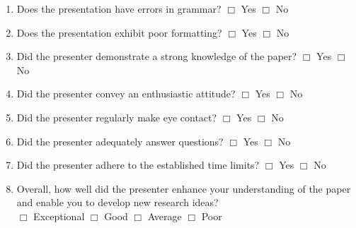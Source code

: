 \documentclass[letterpaper, 10pt]{article} %
\begin{document}
{\begin{enumerate}
\item Does the presentation have errors in grammar? \hspace*{.05in}
  $\Box$ Yes \hspace*{.05in} $\Box$ No

\item Does the presentation exhibit poor formatting? \hspace*{.05in}
  $\Box$ Yes \hspace*{.05in} $\Box$ No

\item Did the presenter demonstrate a strong knowledge of the
  paper? \hspace*{.05in} $\Box$ Yes \hspace*{.05in} $\Box$ No

\item Did the presenter convey an enthusiastic attitude? \hspace*{.05in}
  $\Box$ Yes \hspace*{.05in} $\Box$ No

\item Did the presenter regularly make eye contact? \hspace*{.05in}
  $\Box$ Yes \hspace*{.05in} $\Box$ No

\item Did the presenter adequately answer questions? \hspace*{.05in}
  $\Box$ Yes \hspace*{.05in} $\Box$ No

\item Did the presenter adhere to the established time limits? \hspace*{.05in}
  $\Box$ Yes \hspace*{.05in} $\Box$ No

\item Overall, how well did the presenter enhance your understanding
  of the paper and enable you to develop new research ideas?
  \\ \hspace*{.05in} $\Box$ Exceptional \hspace*{.05in} $\Box$
  Good \hspace*{.05in} $\Box$ Average \hspace*{.05in} $\Box$ Poor

\end{enumerate}

}
\end{document}
